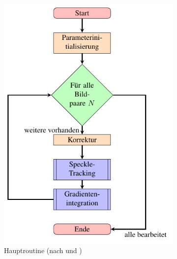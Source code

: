 \begin{figure}[htbp]
	\begin{subfigure}[b]{0.45\textwidth}
		\centering
		\includegraphics[width=\textwidth]{pdf/graph_main}
		\caption[Hauptroutine]{Hauptroutine (nach  und \cite{Coj17})}
		\label{fig:graph_hauptroutine}
	\end{subfigure}
	\hfill
	\begin{subfigure}[b]{0.45\textwidth}
		\centering

\end{subfigure}
\end{figure}
